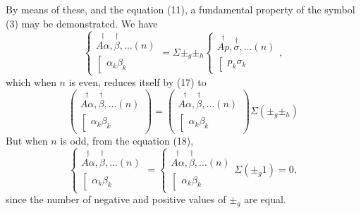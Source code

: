 \documentclass[11pt,a4paper]{article}
\theoremstyle{plain}
\theoremstyle{definition}
\theoremstyle{remark}
\begin{document}
By means of these, and the equation (11), a fundamental property of the symbol
(3) may be demonstrated. We have
\[
\left\{\begin{array}{c}
\stackrel{\dagger}{A\alpha}, \stackrel{\dagger}{\beta}, \ldots (n) \\
\left[\begin{array}{c}
\alpha_k\beta_k
\end{array}\right.
\end{array}\right.
= \Sigma \pm_g \pm_h
\left\{\begin{array}{c}
\stackrel{\dagger}{Ap}, \stackrel{\dagger}{\sigma}, \ldots (n) \\
\left[\begin{array}{c}
p_k\sigma_k
\end{array}\right.
\end{array}\right.
\tag{18},
\]
which when $n$ is even, reduces itself by (17) to
\[
\left(\begin{array}{c}
\stackrel{\dagger}{A\alpha}, \stackrel{\dagger}{\beta}, \ldots (n) \\
\left[\begin{array}{c}
\alpha_k\beta_k
\end{array}\right.
\end{array}\right)
=
\left(\begin{array}{c}
\stackrel{\dagger}{A\alpha}, \stackrel{\dagger}{\beta}, \ldots (n) \\
\left[\begin{array}{c}
\alpha_k\beta_k
\end{array}\right.
\end{array}\right)
\Sigma(\pm_g \pm_h)
\tag{20}
\]
But when $n$ is odd, from the equation (18),
\[
\left\{\begin{array}{c}
\stackrel{\dagger}{A\alpha}, \stackrel{\dagger}{\beta}, \ldots (n) \\
\left[\begin{array}{c}
\alpha_k\beta_k
\end{array}\right.
\end{array}\right.
=
\left\{\begin{array}{c}
\stackrel{\dagger}{A\alpha}, \stackrel{\dagger}{\beta}, \ldots (n) \\
\left[\begin{array}{c}
\alpha_k\beta_k
\end{array}\right.
\end{array}\right.
\Sigma(\pm_g 1) = 0
\tag{21},
\]
since the number of negative and positive values of $\pm_g$ are equal.
\end{document}
